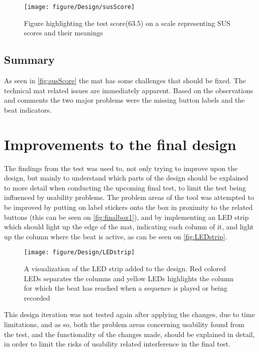 \begin{figure}[H]
	\centering
	\texttt{[image: figure/Design/susScore]}
	\caption{Figure highlighting the test score(63.5) on a scale representing SUS scores and their meanings\cite{susScore}}
	\label{fig:susScore}
\end{figure}

\subsection{Summary}
As seen in \autoref{fig:susScore} the mat has some challenges that should be fixed. The technical mat related issues are immediately apparent. Based on the observations and comments the two major problems were the missing button labels and the beat indicators.

\section{Improvements to the final design}\label{improvementsUsability}
The findings from the test was used to, not only trying to improve upon the design, but mainly to understand which parts of the design should be explained to more detail when conducting the upcoming final test, to limit the test being influenced by usability problems. The problem areas of the tool was attempted to be improved by putting on label stickers onto the box in proximity to the related buttons (this can be seen on \autoref{fig:finalbox1}), and by implementing an LED strip which should light up the edge of the mat, indicating each column of it, and light up the column where the beat is active, as can be seen on \autoref{fig:LEDstrip}.

\begin{figure}[H]
	\centering
	\texttt{[image: figure/Design/LEDstrip]}
	\caption{A visualization of the LED strip added to the design. Red colored LEDs separates the columns and yellow LEDs highlights the column for which the beat has reached when a sequence is played or being recorded}
	\label{fig:LEDstrip}
\end{figure}

This design iteration was not tested again after applying the changes, due to time limitations, and as so, both the problem areas concerning usability found from the test, and the functionality of the changes made, should be explained in detail, in order to limit the risks of usability related interference in the final test.
